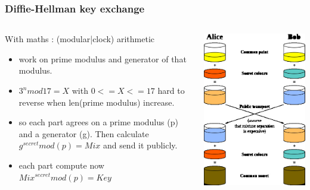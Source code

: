 \begin{frame}
\frametitle{Diffie-Hellman key exchange}
\begin{columns}[c]
\begin{block}{With maths : (modular|clock) arithmetic}
\begin{itemize}
\item work on prime modulus and generator of that modulus.
\item $3^n mod 17 = X$ with $0 <= X <= 17$ hard to reverse when len(prime modulus)
increase.
\item so each part agrees on a prime modulus (p) and a generator (g).
Then calculate $g^{secret} mod(p)=Mix$ and send it publicly.
\item each part compute now $Mix^{secret} mod(p)=Key$
\end{itemize}
\end{block}
\includegraphics[height=.8\textheight]{./materials/diffie-hellman}
\end{columns}
\end{frame}
